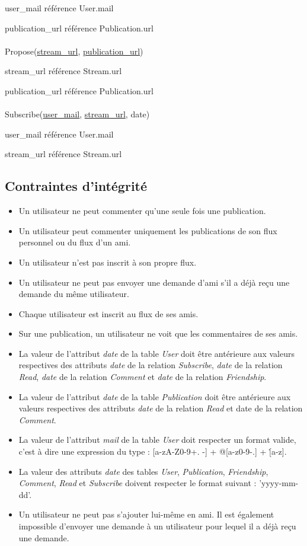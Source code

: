 \documentclass[a4paper,10pt]{article}
\begin{document}
user\_mail référence User.mail

publication\_url référence Publication.url
\\\\
Propose(\underline {stream\_url}, \underline {publication\_url})

stream\_url référence Stream.url

publication\_url référence Publication.url
\\\\
Subscribe(\underline {user\_mail}, \underline {stream\_url}, date)

user\_mail référence User.mail

stream\_url référence Stream.url
\\

\subsection{Contraintes d’intégrité}

	\begin{itemize}
	    \item Un utilisateur ne peut commenter qu'une seule fois une publication.
	    \item Un utilisateur peut commenter uniquement les publications de son flux personnel ou du flux d'un ami.
	    \item Un utilisateur n'est pas inscrit à son propre flux.
	    \item Un utilisateur ne peut pas envoyer une demande d'ami s'il a déjà reçu une demande du même utilisateur.
	    \item Chaque utilisateur est inscrit au flux de ses amis.
	    \item Sur une publication, un utilisateur ne voit que les commentaires de ses amis.
	    \item La valeur de l'attribut \textsl{date} de la table \textsl{User} doit être antérieure aux valeurs respectives des attributs \textsl{date} de la relation \textsl{Subscribe}, \textsl{date} de la relation \textsl{Read}, \textsl{date} de la relation \textsl{Comment} et \textsl{date} de la relation \textsl{Friendship}.
	    \item La valeur de l'attribut \textsl{date} de la table \textsl{Publication} doit être antérieure aux valeurs respectives des attributs \textsl{date} de la relation \textsl{Read} et date de la relation \textsl{Comment}.
	    \item La valeur de l'attribut \textsl{mail} de la table \textsl{User} doit respecter un format valide, c'est à dire une expression du type : [a-zA-Z0-9+. -] + @[a-z0-9-.] + \.[a-z].
	    \item La valeur des attributs \textsl{date} des tables \textsl{User}, \textsl{Publication}, \textsl{Friendship}, \textsl{Comment}, \textsl{Read} et \textsl{Subscribe} doivent respecter le format suivant : 'yyyy-mm-dd'.
	    \item Un utilisateur ne peut pas s'ajouter lui-même en ami. Il est également impossible d'envoyer une demande à un utilisateur pour lequel il a déjà reçu une demande.
	\end{itemize}
\end{document}
